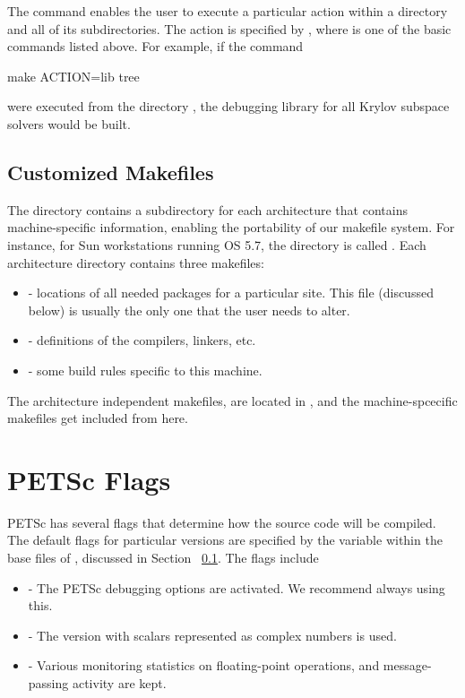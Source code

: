 {{{The  command enables the user to execute a particular action
within a directory and all of its subdirectories.  The action is specified
by , where  is one of the basic commands
listed above. For example, if the command
\begin{tabbing}
   make ACTION=lib tree
\end{tabbing}
were executed from the directory ,
the debugging library for all Krylov subspace solvers would be built.

\subsection{Customized Makefiles}
\label{sec_custom}

The directory  contains a subdirectory for each 
architecture that contains machine-specific information, enabling the
portability of our makefile system.
For instance, for Sun workstations running OS 5.7, the 
directory is called .  Each architecture directory contains
three makefiles:
\begin{itemize}
\item {} - locations of all needed packages for a particular site. 
      This file (discussed below) is usually the only one that the user 
      needs to alter.
\item {} - definitions of the compilers, linkers, etc.
\item {} - some build rules specific to this machine.
\end{itemize}

The architecture independent makefiles, are located in
, and the machine-spcecific
makefiles get included from here.

\section{PETSc Flags}
\label{sec_makeflags}

PETSc has several flags that determine how the source code will be
compiled.  The default flags for particular versions are specified by
the variable  within the base files of , discussed in Section
~\ref{sec_custom}.  The flags include
\begin{itemize}
\item {} - The PETSc debugging options are activated. We 
      recommend always using this. 
\item {} - The version with scalars represented 
      as complex numbers is used. 
\item {} - Various monitoring statistics on floating-point operations,
      and message-passing activity are kept. 
\end{itemize}

}}}

